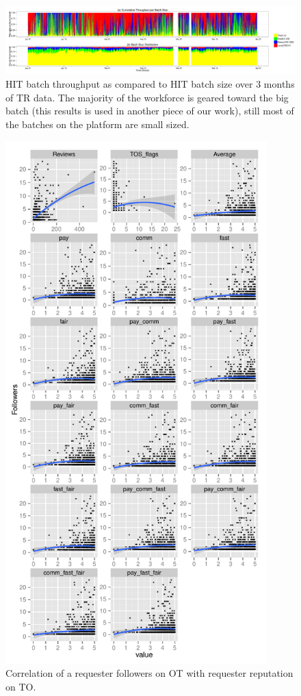 \begin{figure}[htbp]
	\centering
		\includegraphics[width=1.2\textwidth]{figures/analysis_hour}
	\caption{HIT batch throughput as compared to HIT batch size over 3 months of TR data. The majority of the workforce is geared toward the big batch (this results is used in another piece of our work), still most of the batches on the platform are small sized.}
	\label{fig:figure1}
\end{figure}

\begin{figure}[htbp]
	\centering
		\includegraphics[width=0.9\textwidth]{figures/correlation}
	\caption{Correlation of a requester followers on OT with requester reputation on TO.}
	\label{fig:figure2}
\end{figure}